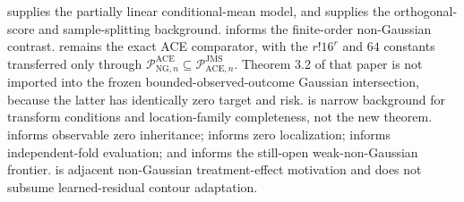 \cite{Robinson1988} supplies the partially linear conditional-mean model, and \cite{ChernozhukovEtAl2018DML} supplies the orthogonal-score and sample-splitting background. \cite{MackeySyrgkanisZadik2018} informs the finite-order non-Gaussian contrast. \cite[Theorem 5.4, condition (21), and bound (22)]{JinMackeySyrgkanis2025} remains the exact ACE comparator, with the \(r!16^r\) and \(64\) constants transferred only through \(\mathcal P_{\mathrm{NG},n}^{\mathrm{ACE}}\subseteq\mathcal P_{\mathrm{ACE},n}^{\mathrm{JMS}}\). Theorem 3.2 of that paper is not imported into the frozen bounded-observed-outcome Gaussian intersection, because the latter has identically zero target and risk. \cite{Mattner1992} is narrow background for transform conditions and location-family completeness, not the new theorem. \cite{HuShiu2022} informs observable zero inheritance; \cite{DinhGhoshTranTran2021} informs zero localization; \cite{NeweyRobins2018} informs independent-fold evaluation; and \cite{LeeMesters2024} informs the still-open weak-non-Gaussian frontier. \cite{ReizingerEtAl2025} is adjacent non-Gaussian treatment-effect motivation and does not subsume learned-residual contour adaptation.